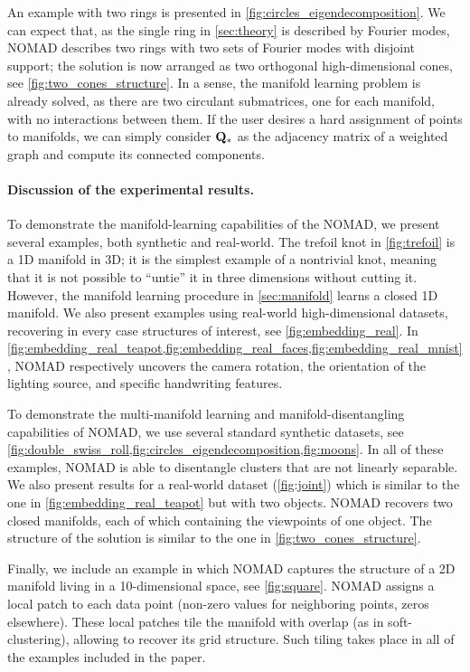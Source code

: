 \documentclass[twoside,11pt]{article}
\begin{document}
An example with two rings is presented in \cref{fig:circles_eigendecomposition}. We can expect that, as the single ring in \cref{sec:theory} is described by Fourier modes, NOMAD describes two rings with two sets of Fourier modes with disjoint support; the solution is now arranged as two orthogonal high-dimensional cones, see \cref{fig:two_cones_structure}. In a sense, the manifold learning problem is already solved, as there are two circulant submatrices, one for each manifold, with no interactions between them.
If the user desires a hard assignment of points to manifolds, we can simply consider ${\mathbf{Q}}_*$ as the adjacency matrix of a weighted graph and compute its connected components.

\paragraph{Discussion of the experimental results.}
To demonstrate the manifold-learning capabilities of the NOMAD, we present several examples, both synthetic and real-world. The trefoil knot in \cref{fig:trefoil} is a 1D manifold in 3D; it is the simplest example of a nontrivial knot, meaning that it is not possible to ``untie'' it in three dimensions without cutting it. However, the manifold learning procedure in \cref{sec:manifold} learns a closed 1D manifold.
We also present examples using real-world high-dimensional datasets, recovering in every case structures of interest, see \cref{fig:embedding_real}. In \cref{fig:embedding_real_teapot,fig:embedding_real_faces,fig:embedding_real_mnist}, NOMAD respectively uncovers the camera rotation, the orientation of the lighting source, and specific handwriting features.

To demonstrate the multi-manifold learning and manifold-disentangling capabilities of NOMAD, we use several standard synthetic datasets, see \cref{fig:double_swiss_roll,fig:circles_eigendecomposition,fig:moons}.  In all of these examples, NOMAD is able to disentangle clusters that are not linearly separable. We also present results for a real-world dataset (\cref{fig:joint}) which is similar to the one in \cref{fig:embedding_real_teapot} but with two objects. NOMAD recovers two closed manifolds, each of which containing the viewpoints of one object. The structure of the solution is similar to the one in \cref{fig:two_cones_structure}.

Finally, we include an example in which NOMAD captures the structure of a 2D manifold living in a 10-dimensional space, see \cref{fig:square}. NOMAD assigns a local patch to each data point (non-zero values for neighboring points, zeros elsewhere). These  local patches tile the manifold with overlap (as in soft-clustering), allowing to recover its grid structure. Such tiling takes place in all of the examples included in the paper.
\end{document}

